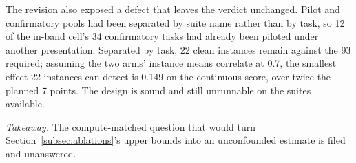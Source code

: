 The revision also exposed a defect that leaves the verdict unchanged. Pilot and confirmatory pools had
been separated by suite name rather than by task, so 12 of the in-band cell's 34 confirmatory tasks had
already been piloted under another presentation. Separated by task, 22 clean instances remain against
the 93 required; assuming the two arms' instance means correlate at 0.7, the smallest effect 22
instances can detect is 0.149 on the continuous score, over twice the planned 7 points. The design is
sound and still unrunnable on the suites available.

\emph{Takeaway.} The compute-matched question that would turn Section~\ref{subsec:ablations}'s upper
bounds into an unconfounded estimate is filed and unanswered.

